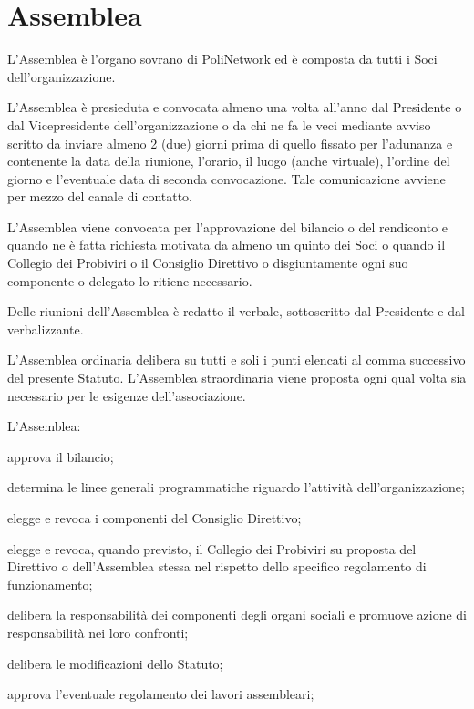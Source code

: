 \documentclass[legalpaper, 11pt]{exam}
\let\tempone\enumerate
\let\temptwo\endenumerate
\renewenvironment{enumerate}{\tempone\addtolength{\itemsep}{-0.45\baselineskip}}{\temptwo}
\begin{document}
{\section{Assemblea}
\begin{enumerate}
 \item L’Assemblea è l’organo sovrano di PoliNetwork ed è composta da tutti i Soci dell’organizzazione.
 \item L’Assemblea è presieduta e convocata almeno una volta all’anno dal Presidente o dal Vicepresidente dell’organizzazione o da chi ne fa le veci mediante avviso scritto da inviare almeno 2 (due) giorni prima di quello fissato per l’adunanza e contenente la data della riunione, l’orario, il luogo (anche virtuale), l’ordine del giorno e l’eventuale data di seconda convocazione. Tale comunicazione avviene per mezzo del canale di contatto.
 \item L’Assemblea viene convocata per l’approvazione del bilancio o del rendiconto e quando ne è fatta richiesta motivata da almeno un quinto dei Soci o quando il Collegio dei Probiviri o il Consiglio Direttivo o disgiuntamente ogni suo componente o delegato lo ritiene necessario.
 \item Delle riunioni dell’Assemblea è redatto il verbale, sottoscritto dal Presidente e dal verbalizzante.
 \item L’Assemblea ordinaria delibera su tutti e soli i punti elencati al comma successivo del presente Statuto. L’Assemblea straordinaria viene proposta ogni qual volta sia necessario per le esigenze dell’associazione.
 \item L'Assemblea:
 \vspace{-5pt}
 \begin{enumerate}
  \item approva il bilancio;
  \item determina le linee generali programmatiche riguardo l’attività dell’organizzazione;
  \item elegge e revoca i componenti del Consiglio Direttivo;
  \item elegge e revoca, quando previsto, il Collegio dei Probiviri su proposta del Direttivo o dell’Assemblea stessa nel rispetto dello specifico regolamento di funzionamento;
  \item delibera la responsabilità dei componenti degli organi sociali e promuove azione di responsabilità nei loro confronti;
  \item delibera le modificazioni dello Statuto;
  \item approva l’eventuale regolamento dei lavori assembleari;

\end{enumerate}
\end{enumerate}}
\end{document}
